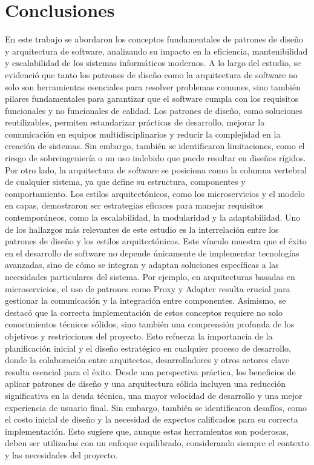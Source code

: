 \documentclass[conference]{IEEEtran}
\begin{document}
\section{Conclusiones}
En este trabajo se abordaron los conceptos fundamentales de patrones de diseño y arquitectura de software, analizando su impacto en la eficiencia, mantenibilidad y escalabilidad de los sistemas informáticos modernos. A lo largo del estudio, se evidenció que tanto los patrones de diseño como la arquitectura de software no solo son herramientas esenciales para resolver problemas comunes, sino también pilares fundamentales para garantizar que el software cumpla con los requisitos funcionales y no funcionales de calidad.
Los patrones de diseño, como soluciones reutilizables, permiten estandarizar prácticas de desarrollo, mejorar la comunicación en equipos multidisciplinarios y reducir la complejidad en la creación de sistemas. Sin embargo, también se identificaron limitaciones, como el riesgo de sobreingeniería o un uso indebido que puede resultar en diseños rígidos. Por otro lado, la arquitectura de software se posiciona como la columna vertebral de cualquier sistema, ya que define su estructura, componentes y comportamiento. Los estilos arquitectónicos, como los microservicios y el modelo en capas, demostraron ser estrategias eficaces para manejar requisitos contemporáneos, como la escalabilidad, la modularidad y la adaptabilidad.
Uno de los hallazgos más relevantes de este estudio es la interrelación entre los patrones de diseño y los estilos arquitectónicos. Este vínculo muestra que el éxito en el desarrollo de software no depende únicamente de implementar tecnologías avanzadas, sino de cómo se integran y adaptan soluciones específicas a las necesidades particulares del sistema. Por ejemplo, en arquitecturas basadas en microservicios, el uso de patrones como Proxy y Adapter resulta crucial para gestionar la comunicación y la integración entre componentes.
Asimismo, se destacó que la correcta implementación de estos conceptos requiere no solo conocimientos técnicos sólidos, sino también una comprensión profunda de los objetivos y restricciones del proyecto. Esto refuerza la importancia de la planificación inicial y el diseño estratégico en cualquier proceso de desarrollo, donde la colaboración entre arquitectos, desarrolladores y otros actores clave resulta esencial para el éxito.
Desde una perspectiva práctica, los beneficios de aplicar patrones de diseño y una arquitectura sólida incluyen una reducción significativa en la deuda técnica, una mayor velocidad de desarrollo y una mejor experiencia de usuario final. Sin embargo, también se identificaron desafíos, como el costo inicial de diseño y la necesidad de expertos calificados para su correcta implementación. Esto sugiere que, aunque estas herramientas son poderosas, deben ser utilizadas con un enfoque equilibrado, considerando siempre el contexto y las necesidades del proyecto.
\end{document}
